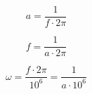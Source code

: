 \documentclass[a4paper, 12pt]{article}
\begin{document}
    
\begin{equation}
    a = \dfrac{1}{f \cdot 2 \pi}
\end{equation}

\begin{equation}
    f = \dfrac{1}{a \cdot 2 \pi}
\end{equation}

\begin{equation}
    \omega = \dfrac{f \cdot 2 \pi}{10^6} = \dfrac{1}{a \cdot 10^6}
\end{equation}
\end{document}
